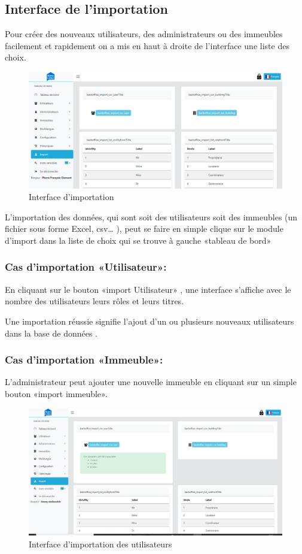 \documentclass[a4paper,10pt]{book}
\begin{document}
\subsection{Interface de l'importation}
Pour créer des nouveaux utilisateurs, des administrateurs ou des immeubles facilement et rapidement on a mis en haut à droite de l'interface une liste des choix. 

\begin{figure}[!h]
\centering 
\includegraphics[width=1\textwidth]{import.PNG}
\caption{Interface d'importation}
\end{figure}
\vspace{4cm}
 L’importation des données, qui sont soit des utilisateurs soit des immeubles (un fichier sous forme  Excel, csv… ), peut se faire en simple clique sur le module d’import dans la liste de choix qui se trouve à gauche «tableau de bord»
 
\subsubsection{ Cas d’importation «Utilisateur»: }
 En cliquant sur le bouton «import Utilisateur» , une interface s’affiche avec le nombre des utilisateurs leurs rôles et leurs titres. 

Une importation réussie signifie l’ajout  d’un ou plusieurs nouveaux utilisateurs dans la base de données .
      

 \subsubsection{ Cas d’importation «Immeuble»: }
L’administrateur peut ajouter une nouvelle immeuble en cliquant sur un simple bouton «import immeuble».

\begin{figure}[!h]
\centering 
\includegraphics[width=1\textwidth]{imp.png}
\caption{Interface  d’importation des utilisateurs}
\end{figure}
\end{document}

